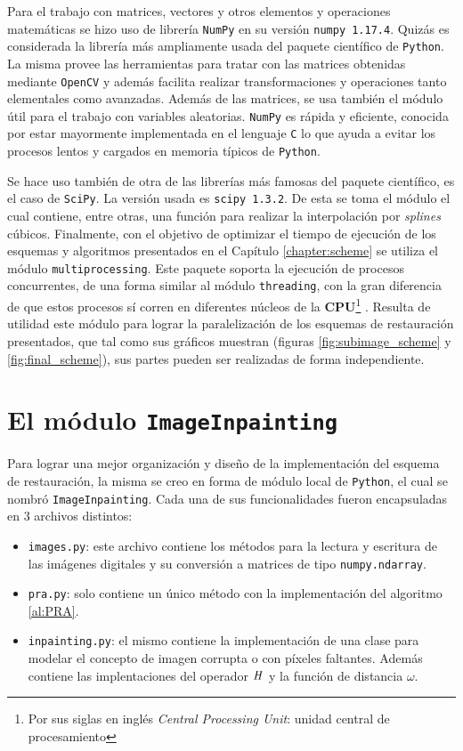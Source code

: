 Para el trabajo con matrices, vectores y otros elementos y operaciones matem\'aticas se hizo uso de librer\'ia \texttt{NumPy} en su versi\'on \texttt{numpy 1.17.4}. Quizás es considerada la librer\'ia m\'as ampliamente usada del paquete científico de \texttt{Python}. La misma provee las herramientas para tratar con las matrices obtenidas mediante \texttt{OpenCV} y adem\'as facilita realizar transformaciones y operaciones tanto elementales como avanzadas. Adem\'as de las matrices, se usa tambi\'en el m\'odulo  \'util para el trabajo con variables aleatorias. \texttt{NumPy} es r\'apida y eficiente, conocida por estar mayormente implementada en el lenguaje \texttt{C} lo que ayuda a evitar los procesos lentos y cargados en memoria t\'ipicos de \texttt{Python}.

Se hace uso tambi\'en de otra de las librer\'ias m\'as famosas del paquete científico, es el caso de \texttt{SciPy}. La versión usada es \texttt{scipy 1.3.2}. De esta se toma el m\'odulo  el cual contiene, entre otras, una funci\'on para realizar la interpolaci\'on por \textit{splines} c\'ubicos. Finalmente, con el objetivo de optimizar el tiempo de ejecuci\'on de los esquemas y algoritmos presentados en el Cap\'itulo \ref{chapter:scheme} se utiliza el m\'odulo \texttt{multiprocessing}. Este paquete soporta la ejecuci\'on de procesos concurrentes, de una forma similar al m\'odulo \texttt{threading}, con la gran diferencia de que estos procesos s\'i corren en diferentes n\'ucleos de la \textbf{CPU}\footnote{Por sus siglas en ingl\'es \textit{Central Processing Unit}: unidad central de procesamiento} \cite{enwiki:cpu}. Resulta de utilidad este m\'odulo para lograr la paralelizaci\'on de los esquemas de restauraci\'on presentados, que tal como sus gr\'aficos muestran (figuras \ref{fig:subimage_scheme} y \ref{fig:final_scheme}), sus partes pueden ser realizadas de forma independiente.

\section{El m\'odulo \texttt{ImageInpainting}}

Para lograr una mejor organizaci\'on y diseño de la implementaci\'on del esquema de restauraci\'on, la misma se creo en forma de m\'odulo local de \texttt{Python}, el cual se nombr\'o \texttt{ImageInpainting}. Cada una de sus funcionalidades fueron encapsuladas en 3 archivos distintos:
\begin{itemize}
	\item \texttt{images.py}: este archivo contiene los m\'etodos para la lectura y escritura de las im\'agenes digitales y su conversi\'on a matrices de tipo \texttt{numpy.ndarray}.
	\item \texttt{pra.py}: solo contiene un \'unico m\'etodo con la implementaci\'on del algoritmo \ref{al:PRA}.
	\item \texttt{inpainting.py}: el mismo contiene la implementaci\'on de una clase para modelar el concepto de imagen corrupta o con p\'ixeles faltantes. Adem\'as contiene las implentaciones del operador $\mathit{H}$ y la funci\'on de distancia $\omega$. 
\end{itemize}

